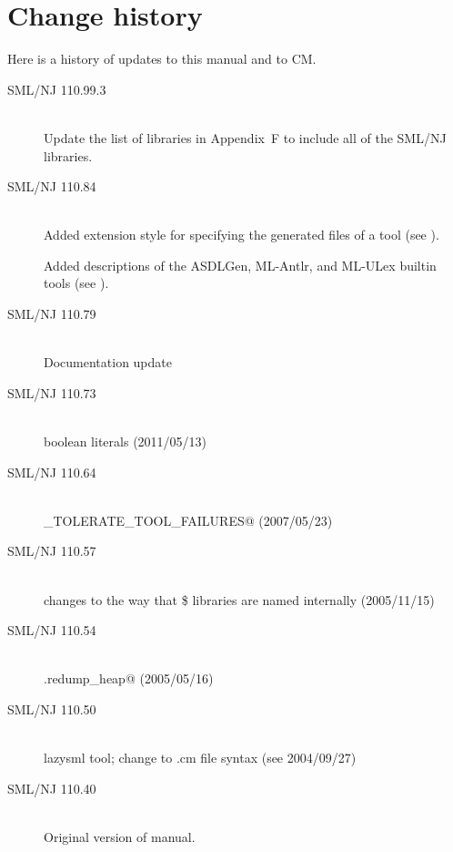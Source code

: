 %
\chapter{Change history}
\label{app:changes}

Here is a history of updates to this manual and to CM.
\begin{description}
  \item[SML/NJ 110.99.3]
    \mbox{}\\[0.5em]
    Update the list of libraries in Appendix~F to include all of the SML/NJ libraries.

  \item[SML/NJ 110.84]
    \mbox{}\\[0.5em]
    Added \lstinline@RENAME@ extension style for specifying the
    generated files of a tool (see ).

    Added descriptions of the ASDLGen, ML-Antlr, and ML-ULex builtin tools
    (see ).

  \item[SML/NJ 110.79]
    \mbox{}\\[0.5em]
    Documentation update

  \item[SML/NJ 110.73]
    \mbox{}\\[0.5em]
    boolean literals (2011/05/13)

  \item[SML/NJ 110.64]
    \mbox{}\\[0.5em]
     \lstinline@CM_TOLERATE_TOOL_FAILURES@ (2007/05/23)

  \item[SML/NJ 110.57]
    \mbox{}\\[0.5em]
    changes to the way that \$ libraries are named internally (2005/11/15)

  \item[SML/NJ 110.54]
    \mbox{}\\[0.5em]
    \lstinline@CM.redump_heap@ (2005/05/16)

  \item[SML/NJ 110.50]
    \mbox{}\\[0.5em]
    lazysml tool; change to .cm file syntax (see 2004/09/27)

  \item[SML/NJ 110.40]
    \mbox{}\\[0.5em]
    Original version of manual.
\end{description}%
